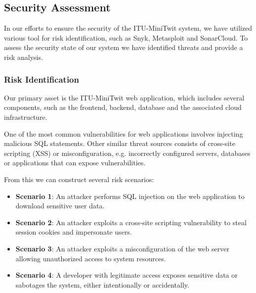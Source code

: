 \subsection{Security Assessment}
In our efforts to ensure the security of the ITU-MiniTwit system, we have utilized various tool for risk identification, such as Snyk, Metasploit and SonarCloud. To assess the security state of our system we have identified threats and provide a risk analysis.

\subsubsection*{Risk Identification}
Our primary asset is the ITU-MiniTwit web application, which includes several components, such as the frontend, backend, database and the associated cloud infrastructure.

One of the most common vulnerabilities for web applications involves injecting malicious SQL statements. Other similar threat sources consists of cross-site scripting (XSS) or misconfiguration, e.g. incorrectly configured servers, databases or applications that can expose vulnerabilities.

From this we can construct several risk scenarios:

\begin{multicols}{2}
    \begin{itemize}
        \item \textbf{Scenario 1}: An attacker performs SQL injection on the web application to download sensitive user data.
        \item \textbf{Scenario 2}: An attacker exploits a cross-site scripting vulnerability to steal session cookies and impersonate users.
        \item \textbf{Scenario 3}: An attacker exploits a misconfiguration of the web server allowing unauthorized access to system resources.
        \item \textbf{Scenario 4}: A developer with legitimate access exposes sensitive data or sabotages the system, either intentionally or accidentally.
    \end{itemize} 
\end{multicols}


